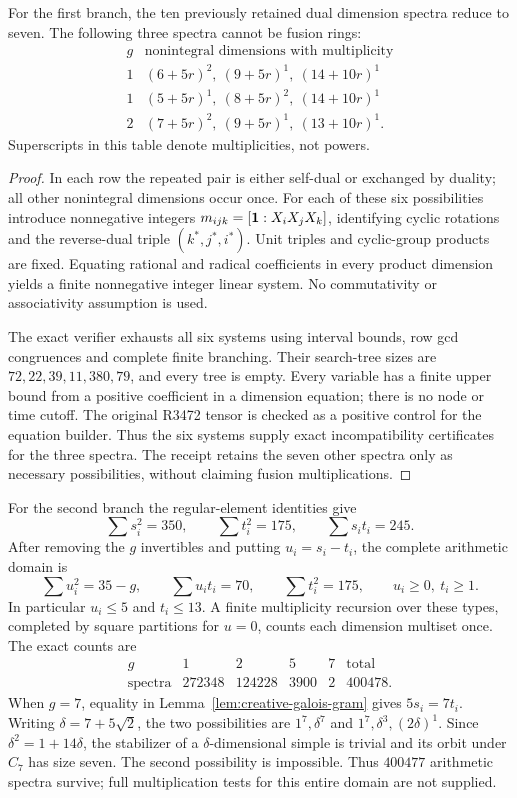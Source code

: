 \begin{proposition}
\label{prop:creative-r3472-three}
For the first branch, the ten previously retained dual dimension spectra
reduce to seven. The following three spectra cannot be fusion rings:
\[
\begin{array}{c|l}
g&\text{nonintegral dimensions with multiplicity}\\\hline
1&(6+5r)^2,\ (9+5r)^1,\ (14+10r)^1\\
1&(5+5r)^1,\ (8+5r)^2,\ (14+10r)^1\\
2&(7+5r)^2,\ (9+5r)^1,\ (13+10r)^1.
\end{array}
\]
Superscripts in this table denote multiplicities, not powers.
\end{proposition}
\begin{proof}
In each row the repeated pair is either self-dual or exchanged by
duality; all other nonintegral dimensions occur once. For each of these
six possibilities introduce nonnegative integers
$m_{ijk}=[\mathbf1:X_iX_jX_k]$, identifying cyclic rotations and the
reverse-dual triple $(k^*,j^*,i^*)$. Unit triples and cyclic-group
products are fixed. Equating rational and radical coefficients in
every product dimension yields a finite nonnegative integer linear
system. No commutativity or associativity assumption is used.

The exact verifier exhausts all six systems using interval bounds,
row gcd congruences and complete finite branching. Their search-tree
sizes are $72,22,39,11,380,79$, and every tree is empty. Every variable
has a finite upper bound from a positive coefficient in a dimension
equation; there is no node or time cutoff. The original R3472 tensor
is checked as a positive control for the equation builder. Thus the
six systems supply exact incompatibility certificates for the three
spectra. The receipt retains the seven other spectra only as necessary
possibilities, without claiming fusion multiplications.
\end{proof}

For the second branch the regular-element identities give
\[
 \sum s_i^2=350,\qquad\sum t_i^2=175,\qquad\sum s_it_i=245.
\]
After removing the $g$ invertibles and putting $u_i=s_i-t_i$, the
complete arithmetic domain is
\[
 \sum u_i^2=35-g,\qquad\sum u_it_i=70,\qquad\sum t_i^2=175,
 \qquad u_i\geq0,\ t_i\geq1.
\]
In particular $u_i\leq5$ and $t_i\leq13$. A finite multiplicity
recursion over these types, completed by square partitions for $u=0$,
counts each dimension multiset once. The exact counts are
\[
 \begin{array}{c|rrrr|r}
 g&1&2&5&7&\text{total}\\\hline
 \text{spectra}&272348&124228&3900&2&400478.
 \end{array}
\]
When $g=7$, equality in Lemma~\ref{lem:creative-galois-gram} gives
$5s_i=7t_i$. Writing $\delta=7+5\sqrt2$, the two possibilities are
$1^7,\delta^7$ and $1^7,\delta^3,(2\delta)^1$.
Since $\delta^2=1+14\delta$, the stabilizer of a $\delta$-dimensional
simple is trivial and its orbit under $C_7$ has size seven. The second
possibility is impossible. Thus $400477$ arithmetic spectra survive;
full multiplication tests for this entire domain are not supplied.

